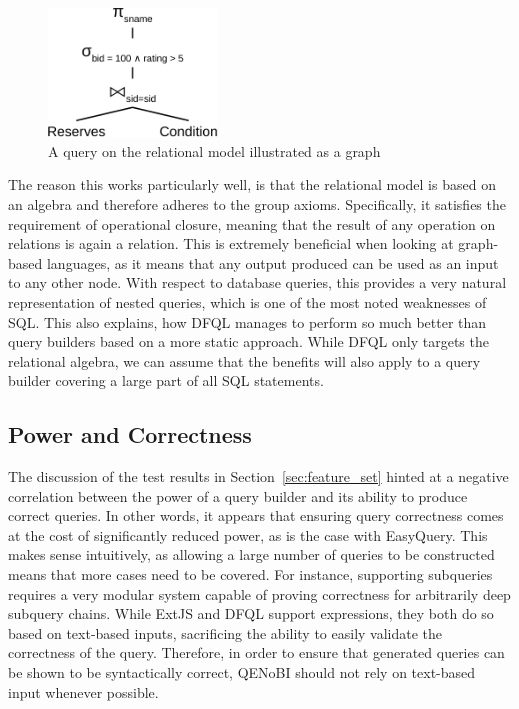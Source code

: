 \documentclass[11pt,a4paper]{globis-book}
\begin{document}
\begin{figure}[h]
  \centering
  \includegraphics[width=0.4\textwidth]{resources/RelAlgGraph.pdf}
  \caption{A query on the relational model illustrated as a graph}
  \label{fig:rel_alg_graph}
\end{figure}

The reason this works particularly well, is that the relational model is based on an algebra and therefore adheres to the group axioms. Specifically, it satisfies the requirement of operational closure, meaning that the result of any operation on relations is again a relation. This is extremely beneficial when looking at graph-based languages, as it means that any output produced can be used as an input to any other node. With respect to database queries, this provides a very natural representation of nested queries, which is one of the most noted weaknesses of SQL. This also explains, how DFQL manages to perform so much better than query builders based on a more static approach. While DFQL only targets the relational algebra, we can assume that the benefits will also apply to a query builder covering a large part of all SQL statements.

\subsection{Power and Correctness}
The discussion of the test results in Section~\ref{sec:feature_set} hinted at a negative correlation between the power of a query builder and its ability to produce correct queries. In other words, it appears that ensuring query correctness comes at the cost of significantly reduced power, as is the case with EasyQuery. This makes sense intuitively, as allowing a large number of queries to be constructed means that more cases need to be covered. For instance, supporting subqueries requires a very modular system capable of proving correctness for arbitrarily deep subquery chains. While ExtJS and DFQL support expressions, they both do so based on text-based inputs, sacrificing the ability to easily validate the correctness of the query. Therefore, in order to ensure that generated queries can be shown to be syntactically correct, QENoBI should not rely on text-based input whenever possible.
\end{document}
